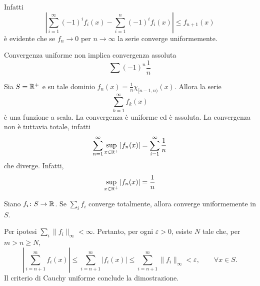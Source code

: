 \documentclass[a4paper]{article}
\begin{document}
\begin{radioactive}
\begin{snippetproof}{}
    Infatti
    \[
        \left|
        \sum_{i=1}^\infty {(-1)}^i f_i(x)-
        \sum_{i=1}^n {(-1)}^i f_i(x)
        \right| \leq f_{n+1}(x)
    \]
    è evidente che se \(f_n \to 0\) per \(n\to\infty\) la serie converge uniformemente.
\end{snippetproof}
\end{radioactive}

\begin{radioactive}
\begin{snippetexample}{Convergenza uniforme non implica convergenza assoluta}
    \[
        \sum {(-1)}^n \frac1n
    \]
\end{snippetexample}
\end{radioactive}

\begin{radioactive}
\begin{snippetexample}{}
    Sia \(S = \mathbb{R}^+\) e su tale dominio \(f_n(x) = \frac1n\chi_{[n-1, n)}(x)\). Allora la serie
    \[
        \sum_{k=1}^\infty f_k(x)
    \]
    è una funzione a scala. La convergenza è uniforme ed è assoluta.
    La convergenza non è tuttavia totale, infatti
    \[
        \sum_{n=1}^\infty \sup_{x \in \mathbb{R}^+} |f_n(x)| = \sum_{i=1}^\infty \frac1n
    \]
    che diverge. Infatti,
    \[
        \sup_{x \in \mathbb{R}^+} |f_n(x)| = \frac1n
    \]
\end{snippetexample}
\end{radioactive}

\begin{radioactive}
\begin{snippetproposition}{}
    Siano \(f_i\colon S\to\mathbb{R}\). Se \(\sum_i f_i\) converge totalmente,
    allora converge uniformemente in \(S\).
\end{snippetproposition}
\end{radioactive}

\begin{radioactive}
\begin{snippetproof}{}
    Per ipotesi \(\sum_i\lVert f_i\rVert_\infty<\infty\). Pertanto, per ogni
    \(\varepsilon>0\), esiste \(N\) tale che, per \(m>n\geq N\),
    \[
        \left|\sum_{i=n+1}^{m}f_i(x)\right|
        \leq\sum_{i=n+1}^{m}|f_i(x)|
        \leq\sum_{i=n+1}^{m}\lVert f_i\rVert_\infty
        <\varepsilon,
        \qquad \forall x\in S.
    \]
    Il criterio di Cauchy uniforme conclude la dimostrazione.
\end{snippetproof}
\end{radioactive}
\end{document}
